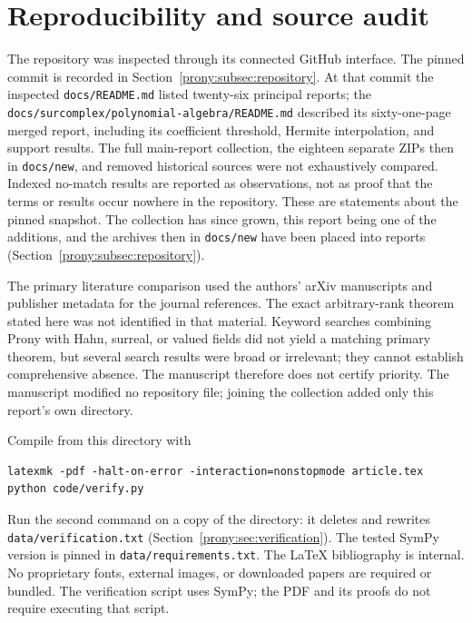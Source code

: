 \documentclass[11pt,letterpaper]{article}
\theoremstyle{definition}
\theoremstyle{remark}
\newcommand{\lbl}[1]{\nolinkurl{#1}}%
\begin{document}
\section{Reproducibility and source audit}
\label{prony:app:audit}
The repository was inspected through its connected GitHub interface. The
pinned commit is recorded in Section~\ref{prony:subsec:repository}. At that
commit the inspected
\lbl{docs/README.md} listed twenty-six principal reports; the
\lbl{docs/surcomplex/polynomial-algebra/README.md} described its
sixty-one-page merged report, including its coefficient threshold,
Hermite interpolation, and support results. The full main-report collection,
the eighteen separate ZIPs then in \lbl{docs/new}, and removed historical
sources were not exhaustively compared. Indexed no-match results are
reported as observations, not as proof that the terms or results occur
nowhere in the repository. These are statements about the pinned snapshot.
The collection has since grown, this report being one of the additions, and
the archives then in \lbl{docs/new} have been placed into reports
(Section~\ref{prony:subsec:repository}).

The primary literature comparison used the authors' arXiv manuscripts
\cite{BY,KDB,AGY,CRV,BG} and publisher metadata for the journal references.
The exact arbitrary-rank theorem stated here was not identified in that
material. Keyword searches combining Prony with Hahn, surreal, or valued
fields did not yield a matching primary theorem, but several search results
were broad or irrelevant; they cannot establish comprehensive absence.
The manuscript therefore does not certify priority. The manuscript modified
no repository file; joining the collection added only this report's own
directory.

\begin{samepage}
Compile from this directory with
\begin{verbatim}
latexmk -pdf -halt-on-error -interaction=nonstopmode article.tex
python code/verify.py
\end{verbatim}
\end{samepage}
Run the second command on a copy of the directory: it deletes and rewrites
\lbl{data/verification.txt} (Section~\ref{prony:sec:verification}). The
tested SymPy version is pinned in \lbl{data/requirements.txt}.
The LaTeX bibliography is internal. No proprietary fonts, external images,
or downloaded papers are required or bundled. The verification script uses
SymPy; the PDF and its proofs do not require executing that script.
\end{document}

